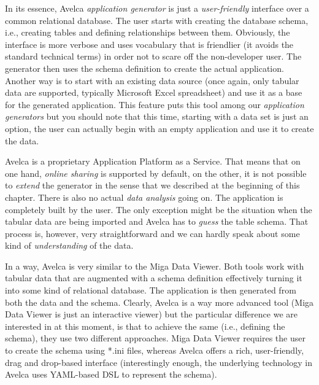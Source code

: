 In its essence, Avelca \emph{application generator} is just a \emph{user-friendly} interface over a common relational database. The user starts with creating the database schema, i.e., creating tables and defining relationships between them. Obviously, the interface is more verbose and uses vocabulary that is friendlier (it avoids the standard technical terms) in order not to scare off the non-developer user. The generator then uses the schema definition to create the actual application. Another way is to start with an existing data source (once again, only tabular data are supported, typically Microsoft Excel spreadsheet) and use it as a base for the generated application. This feature puts this tool among our \emph{application generators} but you should note that this time, starting with a data set is just an option, the user can actually begin with an empty application and use it to create the data.

Avelca is a proprietary Application Platform as a Service. That means that on one hand, \emph{online sharing} is supported by default, on the other, it is not possible to \emph{extend} the generator in the sense that we described at the beginning of this chapter. There is also no actual \emph{data analysis} going on. The application is completely built by the user. The only exception might be the situation when the tabular data are being imported and Avelca has to \emph{guess} the table schema. That process is, however, very straightforward and we can hardly speak about some kind of \emph{understanding} of the data.

In a way, Avelca is very similar to the Miga Data Viewer. Both tools work with tabular data that are augmented with a schema definition effectively turning it into some kind of relational database. The application is then generated from both the data and the schema. Clearly, Avelca is a way more advanced tool (Miga Data Viewer is just an interactive viewer) but the particular difference we are interested in at this moment, is that to achieve the same (i.e., defining the schema), they use two different approaches. Miga Data Viewer requires the user to create the schema using *.ini files, whereas Avelca offers a rich, user-friendly, drag and drop-based interface (interestingly enough, the underlying technology in Avelca uses YAML-based DSL to represent the schema).

